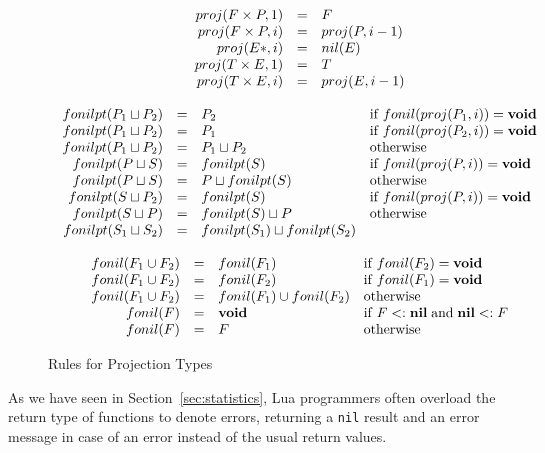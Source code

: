 \documentclass[10pt]{sigplanconf}
\newcommand{\Nil}{\mathbf{nil}}
\newcommand{\subtype}{<:}
\begin{document}
\begin{figure*}[t]
{\[\begin{array}{c}
\begin{array}{rcll}
proj(F \times P, 1) & = & F \\
proj(F \times P, i) & = & proj(P, i-1)\\
proj(E{*}, i) & = & nil(E) \\
proj(T \times E, 1) & = & T \\
proj(T \times E, i) & = & proj(E, i-1)
\end{array}\\\\
\begin{array}{rcll}
fonilpt(P_1 \sqcup P_2) & = & P_2 & \mathrm{if} \; fonil(proj(P_1, i)) = {\bf void} \\
fonilpt(P_1 \sqcup P_2) & = & P_1 & \mathrm{if} \; fonil(proj(P_2, i)) = {\bf void} \\
fonilpt(P_1 \sqcup P_2) & = & P_1 \sqcup P_2 & \mathrm{otherwise}\\
fonilpt(P \sqcup S) & = & fonilpt(S) & \mathrm{if} \; fonil(proj(P, i)) = {\bf void} \\
fonilpt(P \sqcup S) & = & P \sqcup fonilpt(S) & \mathrm{otherwise}\\
fonilpt(S \sqcup P_2) & = & fonilpt(S) & \mathrm{if} \; fonil(proj(P, i)) = {\bf void} \\
fonilpt(S \sqcup P) & = & fonilpt(S) \sqcup P & \mathrm{otherwise}\\
fonilpt(S_1 \sqcup S_2) & = & fonilpt(S_1) \sqcup fonilpt(S_2)
\end{array}\\\\
\begin{array}{rcll}
fonil(F_1 \cup F_2) & = & fonil(F_1) & \mathrm{if}\;fonil(F_2) = {\bf void}\\
fonil(F_1 \cup F_2) & = & fonil(F_2) & \mathrm{if}\;fonil(F_1) = {\bf void}\\
fonil(F_1 \cup F_2) & = & fonil(F_1) \cup fonil(F_2) & \mathrm{otherwise}\\
fonil(F) & = & {\bf void} & \mathrm{if} \; F \subtype \Nil \; \mathrm{and} \; \Nil \subtype F\\
fonil(F) & = & F & \mathrm{otherwise}
\end{array}
\end{array}
\]}
\caption{Rules for Projection Types}
\end{figure*}

As we have seen in Section~\ref{sec:statistics}, Lua
programmers often overload the return type of functions
to denote errors, returning a {\tt nil} result and
an error message in case of an error instead of the
usual return values.
\end{document}
